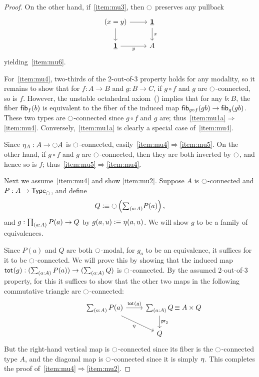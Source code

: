 \begin{proof}
  On the other hand, if~\ref{item:mu3}, then $\modal$ preserves any pullback
  \begin{equation}
  \begin{tikzcd}
  (x=y) \arrow[r] \arrow[d] 
    & \unit \arrow[d,"x"] \\
  \unit \arrow[r,"y"'] 
    & A
  \end{tikzcd}
  \end{equation}
  yielding~\ref{item:mu6}.

  For~\ref{item:mu4}, two-thirds of the 2-out-of-3 property holds for any modality, so it remains to show that for $f:A\to B$ and $g:B\to C$, if $g\circ f$ and $g$ are $\modal$-connected, so is $f$.
  However, the unstable octahedral axiom~(\cite[ex4.4]{TheBook}) implies that for any $b:B$, the fiber $\fib f b$ is equivalent to the fiber of the induced map $\fib{g\circ f}{gb} \to \fib{g}{gb}$.
  These two types are $\modal$-connected since $g\circ f$ and $g$ are; thus~\ref{item:mu1a}$\Rightarrow$\ref{item:mu4}.
  Conversely,~\ref{item:mu1a} is clearly a special case of~\ref{item:mu4}.

  Since $\modalunit[A] : A\to \modal A$ is $\modal$-connected, easily~\ref{item:mu4}$\Rightarrow$\ref{item:mu5}.
  On the other hand, if $g\circ f$ and $g$ are $\modal$-connected, then they are both inverted by $\modal$, and hence so is $f$; thus~\ref{item:mu5}$\Rightarrow$\ref{item:mu4}.

  Next we assume~\ref{item:mu4} and show \ref{item:mu2}.
  Suppose $A$ is $\modal$-connected and $P:A\to\modaltype$, and define
  \[ Q \defeq \modal\left(\sm{a:A} P(a)\right),\]
  and $g:\prd{a:A} P(a) \to Q$ by $g(a,u) \defeq \modalunit(a,u)$.
  We will show $g$ to be a family of equivalences.

  Since $P(a)$ and $Q$ are both $\modal$-modal, for $g_a$ to be an equivalence, it suffices for it to be $\modal$-connected.
  We will prove this by showing that the induced map $\total g:(\sm{a:A} P(a)) \to (\sm{a:A} Q)$ is $\modal$-connected.
  By the assumed 2-out-of-3 property, for this it suffices to show that the other two maps in the following commutative triangle are $\modal$-connected:
  \begin{equation}
  \begin{tikzcd}
  \sm{a:A} P(a) \arrow[r,"{\total g}"] \arrow[dr,swap,"{\modalunit}"]
    & \sm{a:A} Q \mathrlap{\,\jdeq A\times Q} \arrow[d,"\proj2"] \\
  & Q
  \end{tikzcd}
  \end{equation}
  But the right-hand vertical map is $\modal$-connected since its fiber is the $\modal$-connected type $A$,
  and the diagonal map is $\modal$-connected since it is simply $\modalunit$.
  This completes the proof of~\ref{item:mu4}$\Rightarrow$\ref{item:mu2}.


\end{proof}
